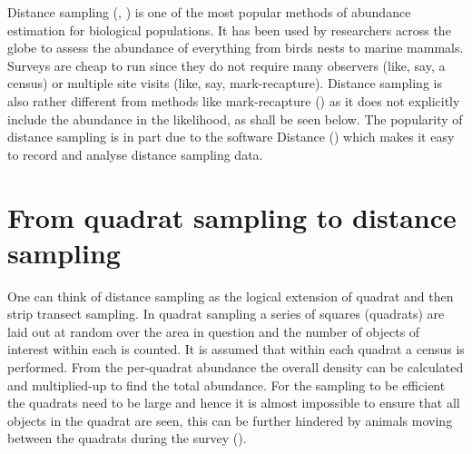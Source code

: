 \label{chap-intro-ds}

\label{intro-DS}

%

Distance sampling (\cite{IDS}, \cite{ADS}) is one of the most popular methods of abundance estimation for biological populations. It has been used by researchers across the globe to assess the abundance of everything from birds nests to marine mammals. Surveys are cheap to run since they do not require many observers (like, say, a census) or multiple site visits (like, say, mark-recapture). Distance sampling is also rather different from methods like mark-recapture (\cite{ruthbook}) as it does not explicitly include the abundance in the likelihood, as shall be seen below. The popularity of distance sampling is in part due to the software Distance (\cite{distance-software}) which makes it easy to record and analyse distance sampling data. 

\section{From quadrat sampling to distance sampling}

One can think of distance sampling as the logical extension of quadrat and then strip transect sampling. In quadrat sampling a series of squares (quadrats) are laid out at random over the area in question and the number of objects of interest within each is counted. It is assumed that within each quadrat a census is performed. From the per-quadrat abundance the overall density can be calculated and multiplied-up to find the total abundance. For the sampling to be efficient the quadrats need to be large and hence it is almost impossible to ensure that all objects in the quadrat are seen, this can be further hindered by animals moving between the quadrats during the survey (\cite[p. 2]{IDS}).

